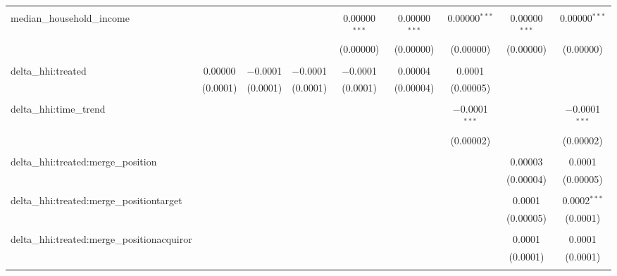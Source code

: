 \begin{table}[H]
{\begin{tabular}{@{\extracolsep{5pt}}lcccccccc}
   & & & & & & & & \\  

  median\_household\_income &  &  &  & 0.00000$^{***}$ & 0.00000$^{***}$ & 0.00000$^{***}$ & 0.00000$^{***}$ & 0.00000$^{***}$ \\  

   &  &  &  & (0.00000) & (0.00000) & (0.00000) & (0.00000) & (0.00000) \\  

   & & & & & & & & \\  

  delta\_hhi:treated & 0.00000 & $-$0.0001 & $-$0.0001 & $-$0.0001 & 0.00004 & 0.0001 &  &  \\  

   & (0.0001) & (0.0001) & (0.0001) & (0.0001) & (0.00004) & (0.00005) &  &  \\  

   & & & & & & & & \\  

  delta\_hhi:time\_trend &  &  &  &  &  & $-$0.0001$^{***}$ &  & $-$0.0001$^{***}$ \\  

   &  &  &  &  &  & (0.00002) &  & (0.00002) \\  

   & & & & & & & & \\  

  delta\_hhi:treated:merge\_position &  &  &  &  &  &  & 0.00003 & 0.0001 \\  

   &  &  &  &  &  &  & (0.00004) & (0.00005) \\  

   & & & & & & & & \\  

  delta\_hhi:treated:merge\_positiontarget &  &  &  &  &  &  & 0.0001 & 0.0002$^{***}$ \\  

   &  &  &  &  &  &  & (0.00005) & (0.0001) \\  

   & & & & & & & & \\  

  delta\_hhi:treated:merge\_positionacquiror &  &  &  &  &  &  & 0.0001 & 0.0001 \\  

   &  &  &  &  &  &  & (0.0001) & (0.0001) \\  

   & & & & & & & & \\  


\end{tabular}}
\end{table}
